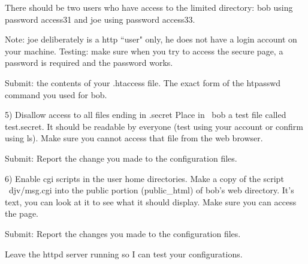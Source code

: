 There should be two users who have access to the {\ltt{}limited}
directory:
{\ltt{}bob} using password {\ltt{}access31}
and 
{\ltt{}joe} using password {\ltt{}access33}.

Note: {\ltt{}joe} deliberately is a http ``user" only,
he does not have a login account on your machine.
Testing: make sure when you try to access the secure page,
a password is required and the password works.

Submit: the contents of your {\ltt{}.htaccess} file.
The exact form of the {\ltt{}htpasswd} command you
used for {\ltt{}bob}.

5) Disallow access to all files ending in {\ltt{}.secret}
Place in {\ltt{}~bob} a test file called {\ltt{}test.secret}.
It should be readable by everyone (test using your account or confirm
using {\ltt{}ls}).
Make sure you cannot access that file from the web browser.

Submit: Report the change you made to the configuration files.

6) Enable cgi scripts in the user home directories.
Make a copy of the script {\ltt{}~djv/msg.cgi} into the public portion
({\ltt{}public_html}) of bob's web directory.
It's text, you can look at it to see what it should display.
Make sure you can access the page.

Submit: Report the changes you made to the configuration files.

Leave the {\ltt{}httpd} server
running so I can test your configurations.

\bye
